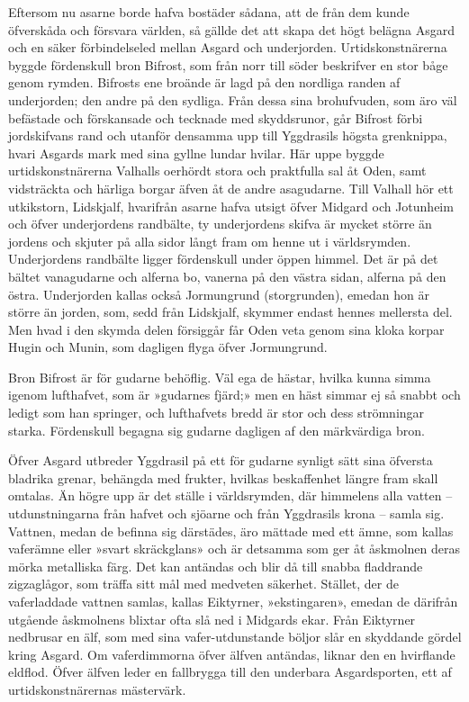 Eftersom nu asarne borde hafva bostäder sådana, att de från dem kunde
öfverskåda och försvara världen, så gällde
det att skapa det högt belägna Asgard och en säker förbindelseled mellan
Asgard och underjorden. Urtidskonstnärerna byggde fördenskull bron
Bifrost, som från norr till söder beskrifver en stor båge genom rymden.
Bifrosts ene broände är lagd på den nordliga randen af underjorden; den
andre på den sydliga. Från dessa sina brohufvuden, som äro väl befästade
och förskansade och tecknade med skyddsrunor, går Bifrost förbi
jordskifvans rand och utanför densamma upp till Yggdrasils högsta
grenknippa, hvari Asgards mark med sina gyllne lundar hvilar. Här uppe
byggde urtidskonstnärerna Valhalls oerhördt stora och praktfulla sal åt
Oden, samt vidsträckta och härliga borgar äfven åt de andre asagudarne.
Till Valhall hör ett utkikstorn, Lidskjalf, hvarifrån asarne hafva
utsigt öfver Midgard och Jotunheim och öfver underjordens randbälte, ty
underjordens skifva är mycket större än jordens och skjuter på alla
sidor långt fram om henne ut i världsrymden. Underjordens randbälte
ligger fördenskull under öppen himmel. Det är på det bältet vanagudarne
och alferna bo, vanerna på den västra sidan, alferna på den östra.
Underjorden kallas också Jormungrund (storgrunden), emedan hon är större
än jorden, som, sedd från Lidskjalf, skymmer endast hennes mellersta
del. Men hvad i den skymda delen försiggår får Oden veta genom sina
kloka korpar Hugin och Munin, som dagligen flyga öfver Jormungrund.

Bron Bifrost är för gudarne behöflig. Väl ega de hästar, hvilka kunna
simma igenom lufthafvet, som är »gudarnes fjärd;» men en häst simmar ej
så snabbt och ledigt som han springer, och lufthafvets bredd är stor och
dess strömningar starka. Fördenskull begagna sig gudarne dagligen af den
märkvärdiga bron.

Öfver Asgard utbreder Yggdrasil på ett för gudarne synligt sätt sina
öfversta bladrika grenar, behängda med frukter, hvilkas beskaffenhet
längre fram skall omtalas. Än högre upp är det ställe i världsrymden,
där himmelens alla vatten -- utdunstningarna från hafvet och sjöarne och
från Yggdrasils
krona -- samla sig. Vattnen, medan de befinna sig därstädes, äro mättade
med ett ämne, som kallas vaferämne eller »svart skräckglans» och är
detsamma som ger åt åskmolnen deras mörka metalliska färg. Det kan
antändas och blir då till snabba fladdrande zigzaglågor, som träffa sitt
mål med medveten säkerhet. Stället, der de vaferladdade vattnen samlas,
kallas Eiktyrner, »ekstingaren», emedan de därifrån utgående åskmolnens
blixtar ofta slå ned i Midgards ekar. Från Eiktyrner nedbrusar en älf,
som med sina vafer-utdunstande böljor slår en skyddande gördel kring
Asgard. Om vaferdimmorna öfver älfven antändas, liknar den en hvirflande
eldflod. Öfver älfven leder en fallbrygga till den underbara
Asgardsporten, ett af urtidskonstnärernas mästervärk.

